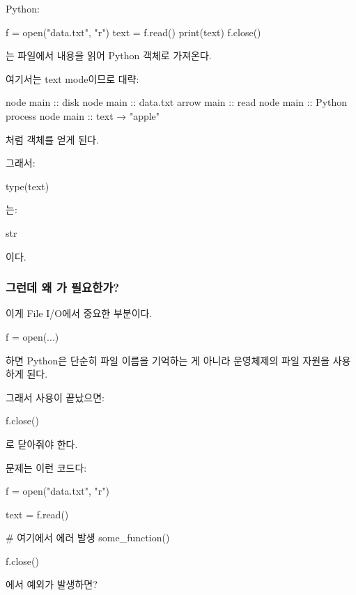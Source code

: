 Python:

\begin{dhkcode}
f = open("data.txt", "r")
text = f.read()
print(text)
f.close()
\end{dhkcode}

는 파일에서 내용을 읽어 Python 객체로 가져온다.

여기서는 text mode이므로 대략:

\begin{dhkbranch}[in=8]
node main :: disk
node main :: data.txt
arrow main :: read
node main :: Python process
node main :: text → "apple\nbanana\norange"
\end{dhkbranch}

처럼 객체를 얻게 된다.

그래서:

\begin{dhkcode}
type(text)
\end{dhkcode}

는:

\begin{dhkzsh}
str
\end{dhkzsh}

이다.

\subsubsection{그런데 왜 가 필요한가?}

이게 File I/O에서 중요한 부분이다.

\begin{dhkcode}
f = open(...)
\end{dhkcode}

하면 Python은 단순히 파일 이름을 기억하는 게 아니라 운영체제의 파일 자원을 사용하게 된다.

그래서 사용이 끝났으면:

\begin{dhkcode}
f.close()
\end{dhkcode}

로 닫아줘야 한다.

문제는 이런 코드다:

\begin{dhkcode}
f = open("data.txt", "r")

text = f.read()

# 여기에서 에러 발생
some_function()

f.close()
\end{dhkcode}

에서 예외가 발생하면?

